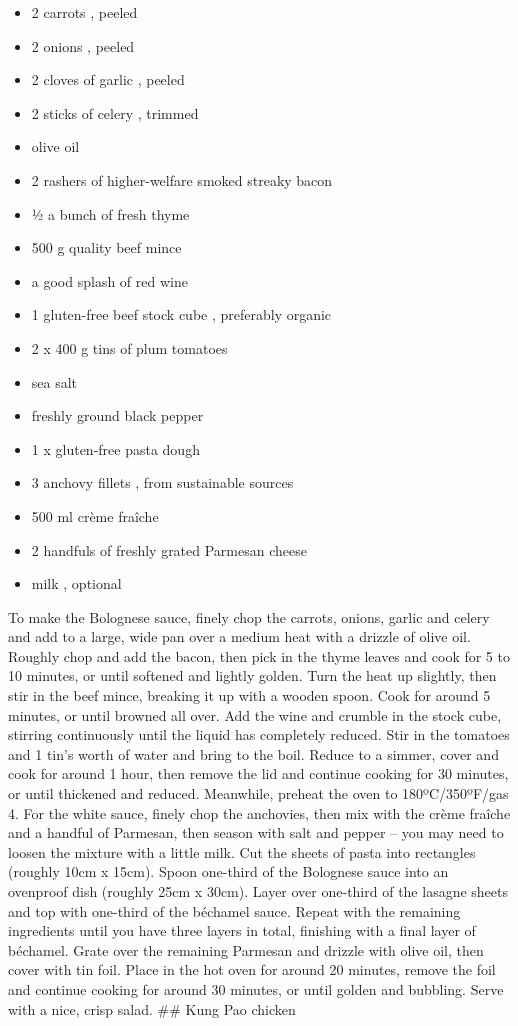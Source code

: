 \documentclass[
]{book}
\begin{document}
\begin{itemize}
\item
  2 carrots , peeled
\item
  2 onions , peeled
\item
  2 cloves of garlic , peeled
\item
  2 sticks of celery , trimmed
\item
  olive oil
\item
  2 rashers of higher-welfare smoked streaky bacon
\item
  ½ a bunch of fresh thyme
\item
  500 g quality beef mince
\item
  a good splash of red wine
\item
  1 gluten-free beef stock cube , preferably organic
\item
  2 x 400 g tins of plum tomatoes
\item
  sea salt
\item
  freshly ground black pepper
\item
  1 x gluten-free pasta dough
\item
  3 anchovy fillets , from sustainable sources
\item
  500 ml crème fraîche
\item
  2 handfuls of freshly grated Parmesan cheese
\item
  milk , optional
\end{itemize}

To make the Bolognese sauce, finely chop the carrots, onions, garlic and celery and add to a large, wide pan over a medium heat with a drizzle of olive oil. Roughly chop and add the bacon, then pick in the thyme leaves and cook for 5 to 10 minutes, or until softened and lightly golden.
Turn the heat up slightly, then stir in the beef mince, breaking it up with a wooden spoon. Cook for around 5 minutes, or until browned all over. Add the wine and crumble in the stock cube, stirring continuously until the liquid has completely reduced. Stir in the tomatoes and 1 tin's worth of water and bring to the boil. Reduce to a simmer, cover and cook for around 1 hour, then remove the lid and continue cooking for 30 minutes, or until thickened and reduced.
Meanwhile, preheat the oven to 180ºC/350ºF/gas 4.
For the white sauce, finely chop the anchovies, then mix with the crème fraîche and a handful of Parmesan, then season with salt and pepper -- you may need to loosen the mixture with a little milk.
Cut the sheets of pasta into rectangles (roughly 10cm x 15cm).
Spoon one-third of the Bolognese sauce into an ovenproof dish (roughly 25cm x 30cm). Layer over one-third of the lasagne sheets and top with one-third of the béchamel sauce. Repeat with the remaining ingredients until you have three layers in total, finishing with a final layer of béchamel. Grate over the remaining Parmesan and drizzle with olive oil, then cover with tin foil. Place in the hot oven for around 20 minutes, remove the foil and continue cooking for around 30 minutes, or until golden and bubbling. Serve with a nice, crisp salad.
\#\# Kung Pao chicken
\end{document}
